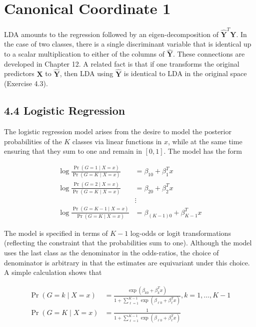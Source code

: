 \documentclass[10pt]{article}
\begin{document}
\section*{Canonical Coordinate 1}
LDA amounts to the regression followed by an eigen-decomposition of $\hat{\mathbf{Y}}^{T} \mathbf{Y}$. In the case of two classes, there is a single discriminant variable that is identical up to a scalar multiplication to either of the columns of $\hat{\mathbf{Y}}$. These connections are developed in Chapter 12. A related fact is that if one transforms the original predictors $\mathbf{X}$ to $\hat{\mathbf{Y}}$, then LDA using $\hat{\mathbf{Y}}$ is identical to LDA in the original space (Exercise 4.3).

\subsection*{4.4 Logistic Regression}
The logistic regression model arises from the desire to model the posterior probabilities of the $K$ classes via linear functions in $x$, while at the same time ensuring that they sum to one and remain in $[0,1]$. The model has the form


\begin{align*}
\log \frac{\operatorname{Pr}(G=1 \mid X=x)}{\operatorname{Pr}(G=K \mid X=x)} & =\beta_{10}+\beta_{1}^{T} x \\
\log \frac{\operatorname{Pr}(G=2 \mid X=x)}{\operatorname{Pr}(G=K \mid X=x)} & =\beta_{20}+\beta_{2}^{T} x  \tag{4.17}\\
& \vdots \\
\log \frac{\operatorname{Pr}(G=K-1 \mid X=x)}{\operatorname{Pr}(G=K \mid X=x)} & =\beta_{(K-1) 0}+\beta_{K-1}^{T} x
\end{align*}


The model is specified in terms of $K-1$ log-odds or logit transformations (reflecting the constraint that the probabilities sum to one). Although the model uses the last class as the denominator in the odds-ratios, the choice of denominator is arbitrary in that the estimates are equivariant under this choice. A simple calculation shows that


\begin{align*}
\operatorname{Pr}(G=k \mid X=x) & =\frac{\exp \left(\beta_{k 0}+\beta_{k}^{T} x\right)}{1+\sum_{\ell=1}^{K-1} \exp \left(\beta_{\ell 0}+\beta_{\ell}^{T} x\right)}, k=1, \ldots, K-1 \\
\operatorname{Pr}(G=K \mid X=x) & =\frac{1}{1+\sum_{\ell=1}^{K-1} \exp \left(\beta_{\ell 0}+\beta_{\ell}^{T} x\right)} \tag{4.18}
\end{align*}
\end{document}
